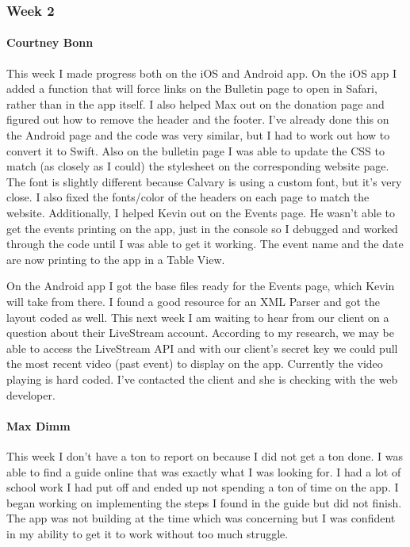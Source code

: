 		\subsubsection{Week 2}
		
			\paragraph{Courtney Bonn}
			This week I made progress both on the iOS and Android app. On the iOS app I added a function that will force links on the Bulletin page to open in Safari, rather than in the app itself. I also helped Max out on the donation page and figured out how to remove the header and the footer. I've already done this on the Android page and the code was very similar, but I had to work out how to convert it to Swift. Also on the bulletin page I was able to update the CSS to match (as closely as I could) the stylesheet on the corresponding website page. The font is slightly different because Calvary is using a custom font, but it's very close. I also fixed the fonts/color of the headers on each page to match the website. Additionally, I helped Kevin out on the Events page. He wasn't able to get the events printing on the app, just in the console so I debugged and worked through the code until I was able to get it working. The event name and the date are now printing to the app in a Table View.

On the Android app I got the base files ready for the Events page, which Kevin will take from there. I found a good resource for an XML Parser and got the layout coded as well. This next week I am waiting to hear from our client on a question about their LiveStream account. According to my research, we may be able to access the LiveStream API and with our client's secret key we could pull the most recent video (past event) to display on the app. Currently the video playing is hard coded. I've contacted the client and she is checking with the web developer.

			\paragraph{Max Dimm}
			This week I don't have a ton to report on because I did not get a ton done. I was able to find a guide online that was exactly what I was looking for. I had a lot of school work I had put off and ended up not spending a ton of time on the app. I began working on implementing the steps I found in the guide but did not finish. The app was not building at the time which was concerning but I was confident in my ability to get it to work without too much struggle.
			
